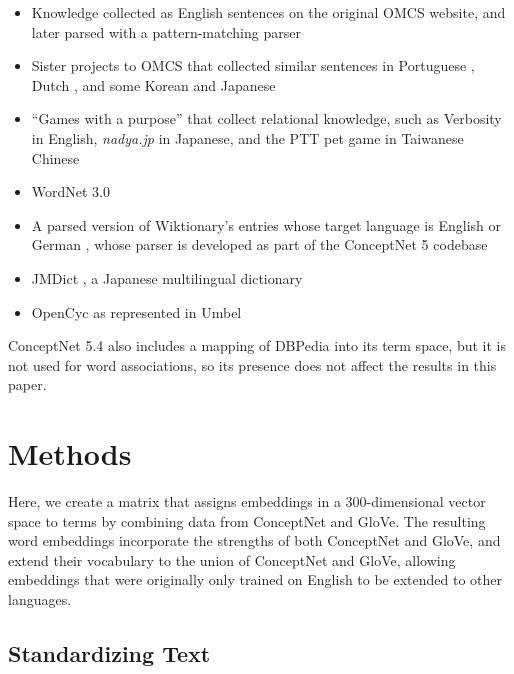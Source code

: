 \documentclass[letterpaper]{article}
\begin{document}
\begin{itemize}
\item Knowledge collected as English sentences on the original OMCS website,
    and later parsed with a pattern-matching parser
\item Sister projects to OMCS that collected similar sentences in Portuguese
    \cite{anacleto2006portuguese},
    Dutch \cite{eckhardt2008kid}, and some Korean and Japanese
    \cite{chung2006globalmind}
\item ``Games with a purpose'' that collect relational knowledge, such as
    Verbosity \cite{vonahn2006verbosity} in English, {\em nadya.jp}
    \cite{nakahara2011nadya} in Japanese, and the PTT pet game \cite{kuo2009petgame}
    in Taiwanese Chinese
\item WordNet 3.0 \cite{miller1998wordnet}
\item A parsed version of Wiktionary's entries whose target language is English
    or German \cite{wiktionary2014en} \cite{wiktionary2014de}, whose parser is
    developed as part of the ConceptNet 5 codebase
\item JMDict \cite{breen2004jmdict}, a Japanese multilingual dictionary
\item OpenCyc \cite{matuszek2006cyc} as represented in Umbel \cite{bergman2008umbel}
\end{itemize}

ConceptNet 5.4 also includes a mapping of DBPedia \cite{auer2007dbpedia} into
its term space, but it is not used for word associations, so its presence does
not affect the results in this paper.



\section{Methods}

Here, we create a matrix that assigns embeddings in a 300-dimensional vector
space to terms by combining data from ConceptNet and GloVe. The resulting word
embeddings incorporate the strengths of both ConceptNet and GloVe, and extend
their vocabulary to the union of ConceptNet and GloVe, allowing embeddings that
were originally only trained on English to be extended to other languages.

\subsection{Standardizing Text}
\end{document}
